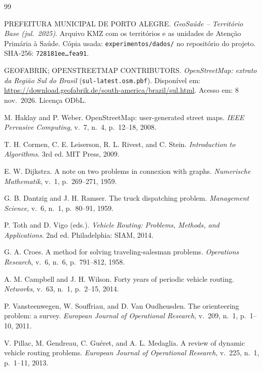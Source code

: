 \documentclass[11pt,a4paper]{article}
\begin{document}
\begin{thebibliography}{99}

PREFEITURA MUNICIPAL DE PORTO ALEGRE.
\textit{GeoSaúde -- Território Base (jul.\ 2025)}. Arquivo KMZ com os territórios e as unidades de Atenção Primária à Saúde. Cópia usada: \texttt{experimentos/dados/} no repositório do projeto. SHA-256: \texttt{728181ee\ldots fea91}.

GEOFABRIK; OPENSTREETMAP CONTRIBUTORS.
\textit{OpenStreetMap: extrato da Região Sul do Brasil} (\texttt{sul-latest.osm.pbf}). Disponível em: \url{https://download.geofabrik.de/south-america/brazil/sul.html}. Acesso em: 8 nov.\ 2026. Licença ODbL.

M. Haklay and P. Weber.
OpenStreetMap: user-generated street maps. \textit{IEEE Pervasive Computing}, v.~7, n.~4, p.~12--18, 2008.

T. H. Cormen, C. E. Leiserson, R. L. Rivest, and C. Stein.
\textit{Introduction to Algorithms}. 3rd ed. MIT Press, 2009.

E. W. Dijkstra.
A note on two problems in connexion with graphs. \textit{Numerische Mathematik}, v.~1, p.~269--271, 1959.

G. B. Dantzig and J. H. Ramser.
The truck dispatching problem. \textit{Management Science}, v.~6, n.~1, p.~80--91, 1959.

P. Toth and D. Vigo (eds.).
\textit{Vehicle Routing: Problems, Methods, and Applications}. 2nd ed. Philadelphia: SIAM, 2014.

G. A. Croes.
A method for solving traveling-salesman problems. \textit{Operations Research}, v.~6, n.~6, p.~791--812, 1958.

A. M. Campbell and J. H. Wilson.
Forty years of periodic vehicle routing. \textit{Networks}, v.~63, n.~1, p.~2--15, 2014.

P. Vansteenwegen, W. Souffriau, and D. Van Oudheusden.
The orienteering problem: a survey. \textit{European Journal of Operational Research}, v.~209, n.~1, p.~1--10, 2011.

V. Pillac, M. Gendreau, C. Guéret, and A. L. Medaglia.
A review of dynamic vehicle routing problems. \textit{European Journal of Operational Research}, v.~225, n.~1, p.~1--11, 2013.


\end{thebibliography}
\end{document}
